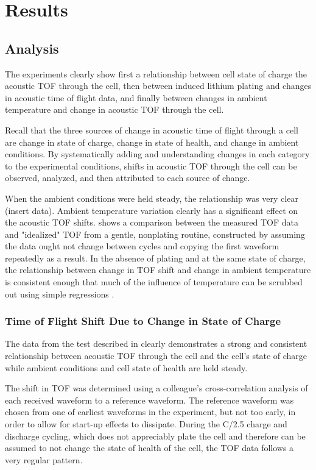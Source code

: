 \chapter{Results}
\section{Analysis}

The experiments clearly show first a relationship between cell state of charge the acoustic TOF through the cell, then between induced lithium plating and changes in acoustic time of flight data, and finally between changes in ambient temperature and change in acoustic TOF through the cell. 

Recall that the three sources of change in acoustic time of flight through a cell are change in state of charge, change in state of health, and change in ambient conditions. 
By systematically adding and understanding changes in each category to the experimental conditions, shifts in acoustic TOF through the cell can be observed, analyzed, and then attributed to each source of change.

When the ambient conditions were held steady, the relationship was very clear (insert data). Ambient temperature variation clearly has a significant effect on the acoustic TOF shifts.  shows a comparison between the measured TOF data and "idealized" TOF from a gentle, nonplating routine, constructed by assuming the data ought not change between cycles and copying the first waveform repeatedly as a result. In the absence of plating and at the same state of charge, the relationship between change in TOF shift and change in ambient temperature is consistent enough that much of the influence of temperature can be scrubbed out using simple regressions .

\subsection{Time of Flight Shift Due to Change in State of Charge}
The data from the test described in  clearly demonstrates a strong and consistent relationship between acoustic TOF through the cell and the cell's state of charge while ambient conditions and cell state of health are held steady.

The shift in TOF was determined using a colleague's cross-correlation analysis of each received waveform to a reference waveform. The reference waveform was chosen from one of earliest waveforms in the experiment, but not too early, in order to allow for start-up effects to dissipate.
During the C/2.5 charge and discharge cycling, which does not appreciably plate the cell and therefore can be assumed to not change the state of health of the cell, the TOF data follows a very regular pattern. 

